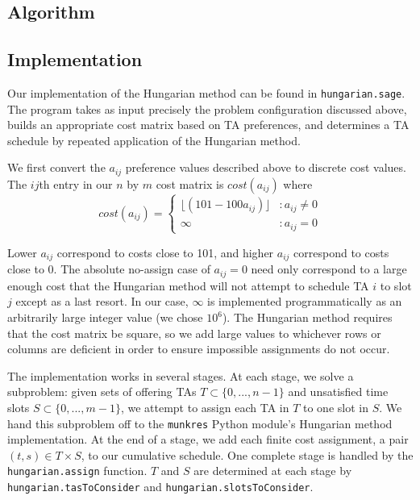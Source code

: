 \documentclass{article}
\begin{document}
\begin{multicols}{2}
\subsection*{Algorithm}

\subsection*{Implementation}

Our implementation of the Hungarian method can be found in \texttt{hungarian.sage}. The program takes as input precisely the problem configuration discussed above, builds an appropriate cost matrix based on TA preferences, and determines a TA schedule by repeated application of the Hungarian method.

We first convert the $a_{ij}$ preference values described above to discrete cost values. The $ij$th entry in our $n$ by $m$ cost matrix is $cost(a_{ij})$ where
\begin{equation}
cost(a_{ij}) = \left\{
   \begin{array}{lr}
      \lfloor(101 - 100a_{ij})\rfloor & : a_{ij} \neq 0 \\
      \infty & : a_{ij} = 0
   \end{array}
   \right.
\end{equation}

Lower $a_{ij}$ correspond to costs close to 101, and higher $a_{ij}$ correspond to costs close to 0. The absolute no-assign case of $a_{ij} = 0$ need only correspond to a large enough cost that the Hungarian method will not attempt to schedule TA $i$ to slot $j$ except as a last resort. In our case, $\infty$ is implemented programmatically as an arbitrarily large integer value (we chose $10^6$). The Hungarian method requires that the cost matrix be square, so we add large values to whichever rows or columns are deficient in order to ensure impossible assignments do not occur.

The implementation works in several stages. At each stage, we solve a subproblem: given sets of offering TAs $T \subset \{0, ..., n - 1\}$ and unsatisfied time slots $S \subset \{0, ..., m - 1\}$, we attempt to assign each TA in $T$ to one slot in $S$. We hand this subproblem off to the \texttt{munkres} Python module's Hungarian method implementation. At the end of a stage, we add each finite cost assignment, a pair $(t, s) \in T \times S$, to our cumulative schedule. One complete stage is handled by the \texttt{hungarian.assign} function. $T$ and $S$ are determined at each stage by \texttt{hungarian.tasToConsider} and \texttt{hungarian.slotsToConsider}.


\end{multicols}
\end{document}
